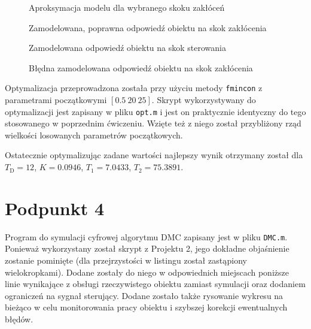\begin{figure}[ht]
\centering

\caption{Aproksymacja modelu dla wybranego skoku zakłóceń}
\label{R3}
\end{figure}

\begin{figure}[ht]
\centering

\caption{Zamodelowana, poprawna odpowiedź obiektu na skok zakłócenia}
\label{R4}
\end{figure}

\begin{figure}[ht]
\centering

\caption{Zamodelowana odpowiedź obiektu na skok sterowania}
\label{R5}
\end{figure}

\begin{figure}[ht]
\centering

\caption{Błędna zamodelowana odpowiedź obiektu na skok zakłócenia}
\label{R6}
\end{figure}

Optymalizacja przeprowadzona została przy użyciu metody \verb+fmincon+ z parametrami początkowymi $[\num{0,5} ~ 20 ~ 25]$. Skrypt wykorzystywany do optymalizacji jest zapisany w pliku \verb|opt.m| i jest on praktycznie identyczny do tego stosowanego w poprzednim ćwiczeniu. Wzięte też z niego został przybliżony rząd wielkości losowanych parametrów początkowych.

Ostatecznie optymalizując zadane wartości najlepszy wynik otrzymany został dla $T_{\mathrm{D}}=12$, $K=\num{0.0946}$, $T_1=\num{7.0433}$, $T_2=\num{75.3891}$.

\chapter{Podpunkt 4}
Program do symulacji cyfrowej algorytmu DMC zapisany jest w pliku \verb+DMC.m+. Ponieważ wykorzystany został skrypt z Projektu 2, jego dokładne objaśnienie zostanie pominięte (dla przejrzystości w listingu został zastąpiony wielokropkami). Dodane zostały do niego w odpowiednich miejscach poniższe linie wynikające z obsługi rzeczywistego obiektu zamiast symulacji oraz dodaniem ograniczeń na sygnał sterujący. Dodane zostało także rysowanie wykresu na bieżąco w celu monitorowania pracy obiektu i szybszej korekcji ewentualnych błędów.

